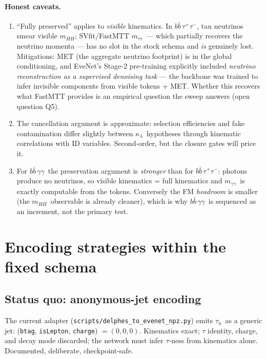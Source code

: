 \documentclass[11pt]{article}
\newcommand{\kl}{\ensuremath{\kappa_\lambda}}
\newcommand{\bbtt}{\ensuremath{b\bar b\,\tau^+\tau^-}}
\newcommand{\bbgg}{\ensuremath{b\bar b\,\gamma\gamma}}
\newcommand{\tauh}{\ensuremath{\tau_h}}
\newcommand{\mhh}{\ensuremath{m_{HH}}}
\newcommand{\mtt}{\ensuremath{m_{\tau\tau}}}
\newcommand{\mgg}{\ensuremath{m_{\gamma\gamma}}}
\begin{document}
\paragraph{Honest caveats.}
\begin{enumerate}[label=(\roman*)]
\item ``Fully preserved'' applies to \emph{visible} kinematics. In \bbtt,
  tau neutrinos smear visible \mhh; SVfit/FastMTT \mtt\ --- which partially
  recovers the neutrino momenta --- has no slot in the stock schema and
  \emph{is} genuinely lost. Mitigations: MET (the aggregate neutrino
  footprint) is in the global conditioning, and EveNet's Stage-2 pre-training
  explicitly included \emph{neutrino reconstruction as a supervised denoising
  task} --- the backbone was trained to infer invisible components from
  visible tokens + MET. Whether this recovers what FastMTT provides is an
  empirical question the sweep answers (open question Q5).
\item The cancellation argument is approximate: selection efficiencies and
  fake contamination differ slightly between \kl\ hypotheses through
  kinematic correlations with ID variables. Second-order, but the closure
  gates will price it.
\item For \bbgg\ the preservation argument is \emph{stronger} than for
  \bbtt: photons produce no neutrinos, so visible kinematics = full
  kinematics and \mgg\ is exactly computable from the tokens. Conversely the
  FM \emph{headroom} is smaller (the \mhh\ observable is already cleaner),
  which is why \bbgg\ is sequenced as an increment, not the primary test.
\end{enumerate}

\section{Encoding strategies within the fixed schema}
\label{sec:encoding}

\subsection{Status quo: anonymous-jet encoding}
The current adapter (\texttt{scripts/delphes\_to\_evenet\_npz.py}) emits
\tauh\ as a generic jet: (\texttt{btag}, \texttt{isLepton},
\texttt{charge}) $= (0,0,0)$. Kinematics exact; $\tau$ identity, charge, and decay mode
discarded; the network must infer $\tau$-ness from kinematics alone.
Documented, deliberate, checkpoint-safe.
\end{document}
